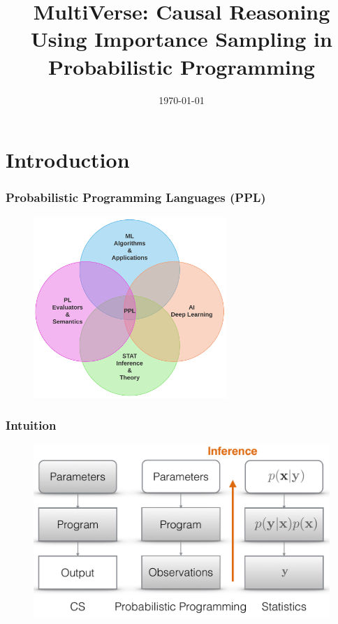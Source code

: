 \documentclass[usenames,dvipsnames]{beamer}
\title[MultiVerse]{MultiVerse: Causal Reasoning Using Importance Sampling in Probabilistic Programming}
\author[Dogan]
{%
\texorpdfstring{
  \begin{columns}
    \column{.85\linewidth}
    \centering
    Presented by:\\
    Haluk Dogan\\
    \url{https://haluk.github.io/}\\
    \href{mailto:hdogan@vivaldi.net}{hdogan@vivaldi.net} \\
    Some slides copied from \\
    Frank Wood
  \end{columns}
}
{Dogan}
}
\institute[UNL] %
{
  Department of Computer Science\\
  University of Nebraska-Lincoln
}
\date[\today] %
{\today}
\begin{document}
\begin{frame}
  \titlepage{}
\end{frame}

\section{Introduction}\label{sec:introduction}
\begin{frame}
  \frametitle{Probabilistic Programming Languages (PPL)}
  \begin{figure}[ht]
    \centering
    \includegraphics[width=0.65\textwidth,keepaspectratio]{figures/pplvenn.pdf}
    \caption*{\label{fig:ppl-venn}}
  \end{figure}
\end{frame}
\begin{frame}
  \frametitle{Intuition}
  \begin{figure}[ht]
    \centering
    \includegraphics[height=0.7\textheight,keepaspectratio]{figures/ppl_similarity.pdf}
    \caption*{\label{fig:ppl-similarity}}
  \end{figure}
\end{frame}
\end{document}
